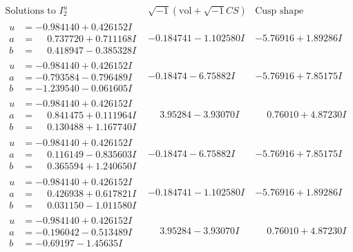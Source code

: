 \documentclass[1p]{elsarticle_modified}
\theoremstyle{definition}
\newcommand{\I}{\sqrt{-1}}
\begin{document}
$$\begin{array}{c|c|c}  
\text{Solutions to }I^u_{2}& \I (\text{vol} + \sqrt{-1}CS) & \text{Cusp shape}\\
 \hline 
\begin{aligned}
u &= -0.984140 + 0.426152 I \\
a &= \phantom{-}0.737720 + 0.711168 I \\
b &= \phantom{-}0.418947 - 0.385328 I\end{aligned}
 & -0.184741 - 1.102580 I & -5.76916 + 1.89286 I \\ \hline\begin{aligned}
u &= -0.984140 + 0.426152 I \\
a &= -0.793584 - 0.796489 I \\
b &= -1.239540 - 0.061605 I\end{aligned}
 & -0.18474 - 6.75882 I & -5.76916 + 7.85175 I \\ \hline\begin{aligned}
u &= -0.984140 + 0.426152 I \\
a &= \phantom{-}0.841475 + 0.111964 I \\
b &= \phantom{-}0.130488 + 1.167740 I\end{aligned}
 & \phantom{-}3.95284 - 3.93070 I & \phantom{-}0.76010 + 4.87230 I \\ \hline\begin{aligned}
u &= -0.984140 + 0.426152 I \\
a &= \phantom{-}0.116149 - 0.835603 I \\
b &= \phantom{-}0.365594 + 1.240650 I\end{aligned}
 & -0.18474 - 6.75882 I & -5.76916 + 7.85175 I \\ \hline\begin{aligned}
u &= -0.984140 + 0.426152 I \\
a &= \phantom{-}0.426938 + 0.617821 I \\
b &= \phantom{-}0.031150 - 1.011580 I\end{aligned}
 & -0.184741 - 1.102580 I & -5.76916 + 1.89286 I \\ \hline\begin{aligned}
u &= -0.984140 + 0.426152 I \\
a &= -0.196042 - 0.513489 I \\
b &= -0.69197 - 1.45635 I\end{aligned}
 & \phantom{-}3.95284 - 3.93070 I & \phantom{-}0.76010 + 4.87230 I \\ \hline\begin{aligned}

\end{aligned}
\end{array}$$
\end{document}
